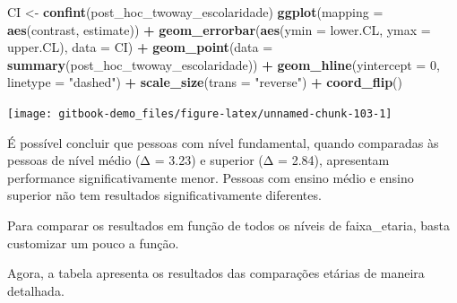 \documentclass[
]{book}
\newenvironment{Shaded}{\begin{snugshade}}{\end{snugshade}}
\newcommand{\DataTypeTok}[1]{\textcolor[rgb]{0.13,0.29,0.53}{#1}}
\newcommand{\DecValTok}[1]{\textcolor[rgb]{0.00,0.00,0.81}{#1}}
\newcommand{\KeywordTok}[1]{\textcolor[rgb]{0.13,0.29,0.53}{\textbf{#1}}}
\newcommand{\NormalTok}[1]{#1}
\newcommand{\OperatorTok}[1]{\textcolor[rgb]{0.81,0.36,0.00}{\textbf{#1}}}
\newcommand{\StringTok}[1]{\textcolor[rgb]{0.31,0.60,0.02}{#1}}
\begin{document}
\begin{Shaded}
\begin{Highlighting}[]
\NormalTok{CI <-}\StringTok{ }\KeywordTok{confint}\NormalTok{(post_hoc_twoway_escolaridade)}
\KeywordTok{ggplot}\NormalTok{(}\DataTypeTok{mapping =} \KeywordTok{aes}\NormalTok{(contrast, estimate)) }\OperatorTok{+}
\StringTok{  }\KeywordTok{geom_errorbar}\NormalTok{(}\KeywordTok{aes}\NormalTok{(}\DataTypeTok{ymin =}\NormalTok{ lower.CL, }\DataTypeTok{ymax =}\NormalTok{ upper.CL), }\DataTypeTok{data =}\NormalTok{ CI) }\OperatorTok{+}
\StringTok{  }\KeywordTok{geom_point}\NormalTok{(}\DataTypeTok{data =} \KeywordTok{summary}\NormalTok{(post_hoc_twoway_escolaridade)) }\OperatorTok{+}
\StringTok{  }\KeywordTok{geom_hline}\NormalTok{(}\DataTypeTok{yintercept =} \DecValTok{0}\NormalTok{, }\DataTypeTok{linetype =} \StringTok{"dashed"}\NormalTok{) }\OperatorTok{+}\StringTok{ }
\StringTok{  }\KeywordTok{scale_size}\NormalTok{(}\DataTypeTok{trans =} \StringTok{"reverse"}\NormalTok{) }\OperatorTok{+}\StringTok{ }
\StringTok{  }\KeywordTok{coord_flip}\NormalTok{()}
\end{Highlighting}
\end{Shaded}

\begin{center}\texttt{[image: gitbook-demo\_files/figure-latex/unnamed-chunk-103-1]} \end{center}

É possível concluir que pessoas com nível fundamental, quando comparadas às pessoas de nível médio (Δ = 3.23) e superior (Δ = 2.84), apresentam performance significativamente menor. Pessoas com ensino médio e ensino superior não tem resultados significativamente diferentes.

Para comparar os resultados em função de todos os níveis de faixa\_etaria, basta customizar um pouco a função.

\begin{Shaded}
\end{Shaded}

Agora, a tabela apresenta os resultados das comparações etárias de maneira detalhada.
\end{document}
